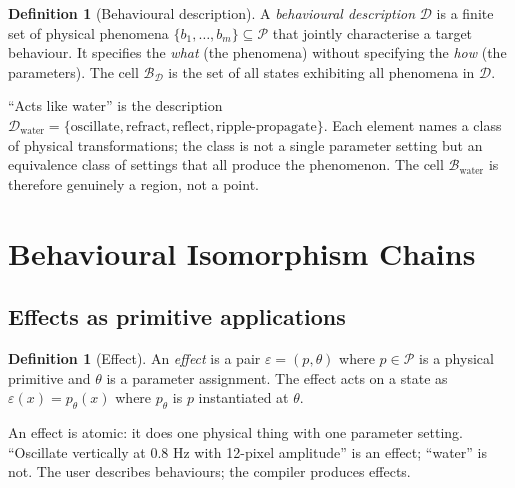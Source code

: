 \documentclass[twocolumn,11pt,a4paper]{article}
\theoremstyle{mee}
\theoremstyle{definition}
\newtheorem{definition}[theorem]{Definition}
\theoremstyle{remark}
\newcommand{\BState}{\mathcal{B}}
\newcommand{\Eff}{\varepsilon}
\newcommand{\Desc}{\mathcal{D}}
\newcommand{\Phys}{\mathcal{P}}
\begin{document}
\begin{definition}[Behavioural description]
\label{def:desc}
A \emph{behavioural description} $\Desc$ is a finite set of physical
phenomena $\{b_1,\dots,b_m\}\subseteq\Phys$ that jointly characterise a
target behaviour. It specifies the \emph{what} (the phenomena) without
specifying the \emph{how} (the parameters). The cell $\BState_\Desc$ is
the set of all states exhibiting all phenomena in $\Desc$.
\end{definition}

``Acts like water'' is the description
$\Desc_{\text{water}}=\{\text{oscillate},\text{refract},\text{reflect},
\text{ripple-propagate}\}$. Each element names a class of physical
transformations; the class is not a single parameter setting but an
equivalence class of settings that all produce the phenomenon. The cell
$\BState_{\text{water}}$ is therefore genuinely a region, not a point.

\section{Behavioural Isomorphism Chains}
\label{sec:iso}

\subsection{Effects as primitive applications}

\begin{definition}[Effect]
\label{def:effect}
An \emph{effect} is a pair $\Eff=(p,\theta)$ where $p\in\Phys$ is a
physical primitive and $\theta$ is a parameter assignment. The effect acts
on a state as $\Eff(x)=p_\theta(x)$ where $p_\theta$ is $p$ instantiated
at $\theta$.
\end{definition}

An effect is atomic: it does one physical thing with one parameter
setting. ``Oscillate vertically at 0.8 Hz with 12-pixel amplitude'' is an
effect; ``water'' is not. The user describes behaviours; the compiler
produces effects.
\end{document}
